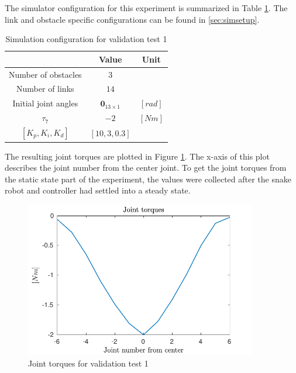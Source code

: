 The simulator configuration for this experiment is summarized in Table \ref{tab:exp_valid1}. The link and obstacle specific configurations can be found in \ref{sec:simsetup}.

\begin{table}[]
    \centering
    \begin{tabular}{|c|c|c|}
        \hline
        & Value & Unit\\
        \hline
        Number of obstacles & $3$ & \\
        Number of links & $14$ & \\
        Initial joint angles & $\mathbf{0}_{13 \times 1}$ & $[rad]$ \\
        $\tau_7$ & $-2$ & $[Nm]$ \\
        $[K_p, K_i, K_d]$ & $[10, 3, 0.3]$ &\\
        \hline
    \end{tabular}
    \caption{Simulation configuration for validation test 1}
    \label{tab:exp_valid1}
\end{table}

The resulting joint torques are plotted in Figure \ref{fig:validation1}. The x-axis of this plot describes the joint number from the center joint. To get the joint torques from the static state part of the experiment, the values were collected after the snake robot and controller had settled into a steady state.

\begin{figure}
    \centering
    \includegraphics[width=0.9\textwidth]{figures/experiments/validation1.pdf}
    \caption{Joint torques for validation test 1}
    \label{fig:validation1}
\end{figure}


